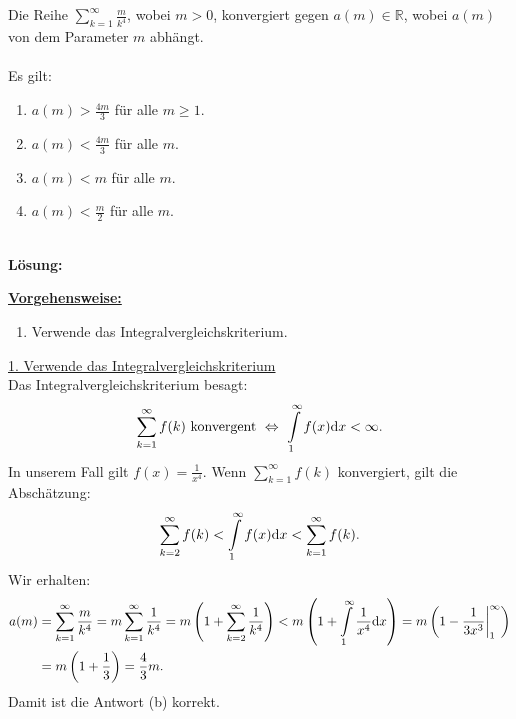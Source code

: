 \subsection*{}
Die Reihe $ \sum_{k=1}^\infty \frac{m}{k^4} $, wobei $ m > 0 $, konvergiert gegen $ a(m) \in \mathbb{R} $, wobei $ a(m) $ von dem Parameter $ m $ abhängt.\\
\\
Es gilt:
\renewcommand{\labelenumi}{(\alph{enumi})}
\begin{enumerate}
	\item 
	$ a(m) > \frac{4m}{3} $ für alle $ m \geq 1 $.
	\item 
	$ a(m) < \frac{4m}{3} $ für alle $ m  $.
	\item 
	$ a(m) < m $ für alle $ m  $.
	\item
	$ a(m) < \frac{m}{2} $ für alle $ m  $.
\end{enumerate}
\ \\
\textbf{Lösung:}
\begin{mdframed}
\underline{\textbf{Vorgehensweise:}}
\renewcommand{\labelenumi}{\theenumi.}
\begin{enumerate}
\item Verwende das Integralvergleichskriterium.
\end{enumerate}
\end{mdframed}

\underline{1. Verwende das Integralvergleichskriterium}\\
Das Integralvergleichskriterium besagt:
\begin{align*}
	\sum \limits_{k=1}^\infty f(k) \ \textrm{konvergent}
	\ \Leftrightarrow \
	\int \limits_1^\infty f(x) \text{\rmfamily d} x < \infty.
\end{align*}
In unserem Fall gilt $ f (x) = \frac{1}{x^4} $. Wenn $ \sum_{k=1}^\infty f(k) $ konvergiert, gilt die Abschätzung:
\begin{align*}
	\sum \limits_{k=2}^\infty f(k) 
	<
	\int \limits_1^\infty f(x) \text{\rmfamily d} x
	<
	\sum \limits_{k=1}^\infty f(k). 
\end{align*}
Wir erhalten:
\begin{align*}
	a(m)
	&=
	\sum \limits_{k=1}^\infty \frac{m}{k^4}
	=
	m \sum \limits_{k=1}^\infty \frac{1}{k^4}
	=
	m\left(1 + \sum \limits_{k=2}^\infty \frac{1}{k^4} \right)
	<
	m \left(1 + \int \limits_1^\infty \frac{1}{x^4} \text{\rmfamily d} x \right)
	=
	m \left(
	1 -  \frac{1}{3x^3} \bigg|_1^\infty
	\right)\\
	&=
	m 
	\left(1  + \frac{1}{3} \right)
	=
 	\frac{4}{3}	m.
\end{align*}
Damit ist die Antwort (b) korrekt.

